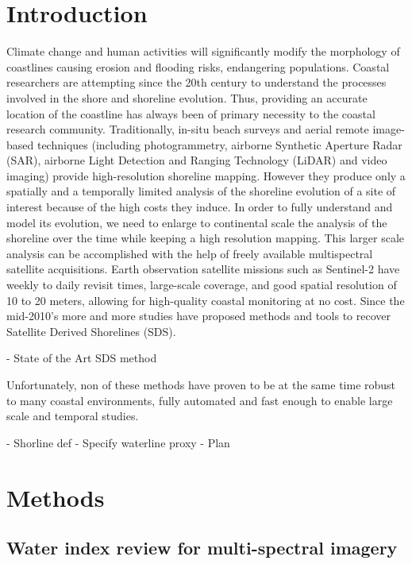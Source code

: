 \documentclass[remotesensing,article,submit,pdftex,moreauthors]{Definitions/mdpi}
\begin{document}
\section{Introduction}



Climate change and human activities will significantly modify the morphology of coastlines causing erosion and flooding risks, endangering populations. Coastal researchers are attempting since the 20th century to understand the processes involved in the shore and shoreline evolution. \citep{STIVE2002211}
Thus, providing an accurate location of the coastline has always been of primary necessity to the coastal research community.
Traditionally, in-situ beach surveys and aerial remote image-based techniques (including photogrammetry, airborne Synthetic Aperture Radar (SAR), airborne Light Detection and Ranging Technology (LiDAR) and video imaging) provide high-resolution shoreline mapping.
However they produce only a spatially and a temporally limited analysis of the shoreline evolution of a site of interest because of the high costs they induce. \citep{MCALLISTER2022, BOAK2005}
In order to fully understand and model its evolution, we need to enlarge to continental scale the analysis of the shoreline over the time while keeping a high resolution mapping.
This larger scale analysis can be accomplished with the help of freely available multispectral satellite acquisitions.
Earth observation satellite missions such as Sentinel-2 have weekly to daily revisit times, large-scale coverage, and good spatial resolution of 10 to 20 meters, allowing for high-quality coastal monitoring at no cost. \citep{BERGSMA2020} 
Since the mid-2010's more and more studies have proposed methods and tools to recover Satellite Derived Shorelines (SDS).

- State of the Art SDS method \citep{VOS2019_sub}

Unfortunately, non of these methods have proven to be at the same time robust to many coastal environments, fully automated and fast enough to enable large scale and temporal studies. \citep{MCALLISTER2022}

- Shorline def
- Specify waterline proxy
- Plan

\section{Methods}
\subsection{Water index review for multi-spectral imagery}
\end{document}

